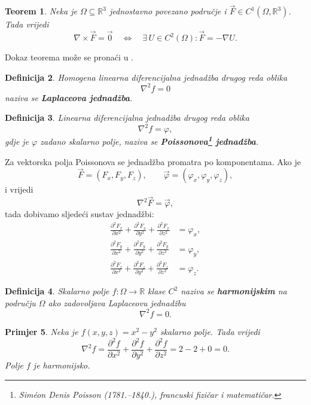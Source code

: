 \documentclass[12pt,a4paper]{article}
\makeatletter
\newtheorem{tm}{Teorem}[section]
\newtheorem{pr}[tm]{Primjer}
\newtheorem{deff}[tm]{Definicija}
\renewenvironment{proof}[1][\proofname]{\par
  \pushQED{\qed}%
  \normalfont
  \topsep6\p@\@plus6\p@\relax
  \trivlist
  \item[\hskip\labelsep
  \bfseries #1\@addpunct{.}]\ignorespaces
}{%
  \popQED\endtrivlist\@endpefalse
}
\makeatother
\begin{document}
\begin{tm}
Neka je $\Omega\subseteq\mathbb{R}^3$ jednostavno povezano područje i
$\overrightarrow{F}\in C^1(\Omega,\mathbb{R}^3)$. Tada vrijedi
\[
\nabla\times\overrightarrow{F}=\overrightarrow{0}
\quad\Longleftrightarrow\quad
\exists\, U\in C^2(\Omega):
\overrightarrow{F}=-\nabla U.
\]
\end{tm}
\begin{proof}
    Dokaz teorema može se pronaći u \cite{arfken}.
\end{proof}
\begin{deff}
Homogena linearna diferencijalna jednadžba drugog reda oblika
$$
\nabla^2 f=0
$$
naziva se \textbf{\textit{Laplaceova jednadžba}}.
\end{deff}

\begin{deff}
Linearna diferencijalna jednadžba drugog reda oblika
$$
\nabla^2 f=\varphi,
$$
gdje je $\varphi$ zadano skalarno polje, naziva se
\textbf{\textit{Poissonova}\footnote{Siméon Denis Poisson (1781.--1840.), francuski fizičar i matematičar.} \textbf{jednadžba}}.
\end{deff}

Za vektorska polja Poissonova se jednadžba promatra po komponentama. Ako je
$$
\overrightarrow{F}=(F_x,F_y,F_z),
\qquad
\overrightarrow{\varphi}=(\varphi_x,\varphi_y,\varphi_z),
$$
i vrijedi
$$
\nabla^2\overrightarrow{F}=\overrightarrow{\varphi},
$$
tada dobivamo sljedeći sustav jednadžbi:
$$
\begin{aligned}
\frac{\partial^2F_x}{\partial x^2}
+\frac{\partial^2F_x}{\partial y^2}
+\frac{\partial^2F_x}{\partial z^2}
&=\varphi_x,\\
\frac{\partial^2F_y}{\partial x^2}
+\frac{\partial^2F_y}{\partial y^2}
+\frac{\partial^2F_y}{\partial z^2}
&=\varphi_y,\\
\frac{\partial^2F_z}{\partial x^2}
+\frac{\partial^2F_z}{\partial y^2}
+\frac{\partial^2F_z}{\partial z^2}
&=\varphi_z.
\end{aligned}
$$
\begin{deff}
Skalarno polje $f:\Omega\to\mathbb{R}$ klase $C^2$ naziva se
\textbf{\textit{harmonijskim}} na području $\Omega$ ako zadovoljava Laplaceovu
jednadžbu
$$
\nabla^2 f=0.
$$
\end{deff}

\begin{pr}
Neka je $f(x,y,z)=x^2-y^2$ skalarno polje. Tada vrijedi
$$
\nabla^2 f
=
\frac{\partial^2 f}{\partial x^2}
+
\frac{\partial^2 f}{\partial y^2}
+
\frac{\partial^2 f}{\partial z^2}
=
2-2+0
=
0.
$$
Polje $f$ je harmonijsko. \end{pr}
\end{document}
